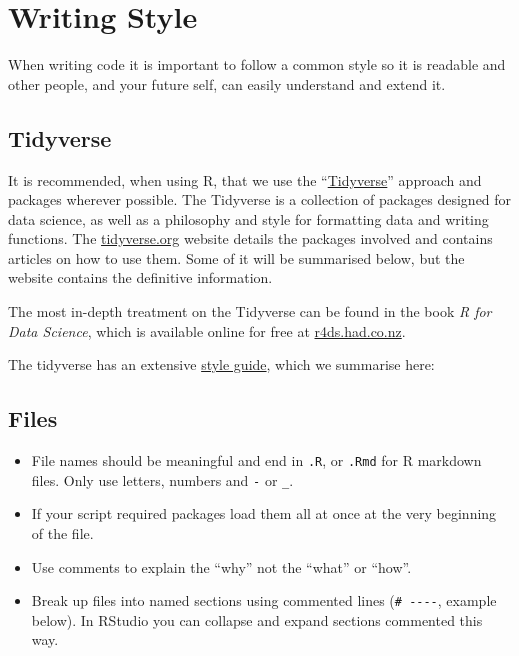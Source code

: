 \documentclass[]{book}
\providecommand{\tightlist}{%
  \setlength{\itemsep}{0pt}\setlength{\parskip}{0pt}}
\begin{document}
\hypertarget{writing-style}{%
\section{Writing Style}\label{writing-style}}

When writing code it is important to follow a common style so it is readable and
other people, and your future self, can easily understand and extend it.

\hypertarget{tidyverse}{%
\subsection{Tidyverse}\label{tidyverse}}

It is recommended, when using R, that we use the ``\href{https://www.tidyverse.org/}{Tidyverse}''
approach and packages wherever possible. The Tidyverse is a collection of packages designed
for data science, as well as a philosophy and style for formatting data and writing functions.
The \href{https://www.tidyverse.org/}{tidyverse.org} website details the packages involved and
contains articles on how to use them. Some of it will be summarised below, but the website
contains the definitive information.

The most in-depth treatment on the Tidyverse can be found in the book \emph{R for Data Science},
which is available online for free at \href{http://r4ds.had.co.nz/}{r4ds.had.co.nz}.

The tidyverse has an extensive \href{http://style.tidyverse.org/}{style guide}, which we
summarise here:

\hypertarget{files}{%
\subsection{Files}\label{files}}

\begin{itemize}
\tightlist
\item
  File names should be meaningful and end in \texttt{.R}, or \texttt{.Rmd} for R markdown files. Only
  use letters, numbers and \texttt{-} or \texttt{\_}.
\item
  If your script required packages load them all at once at the very beginning of the
  file.
\item
  Use comments to explain the ``why'' not the ``what'' or ``how''.
\item
  Break up files into named sections using commented lines (\texttt{\#\ -\/-\/-\/-}, example below). In
  RStudio you can collapse and expand sections commented this way.
\end{itemize}
\end{document}
